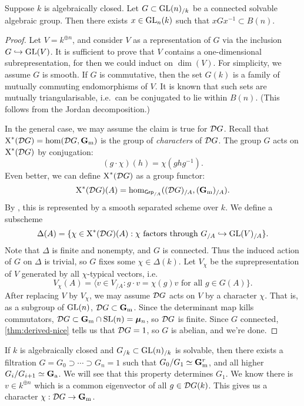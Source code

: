 \begin{theorem}\label{thm:lie-kolchin}
Suppose $k$ is algebraically closed. Let $G\subset \operatorname{GL}(n)_{/k}$ be a 
connected solvable algebraic group. Then there exists $x\in \operatorname{GL}_n(k)$ such that 
$x G x^{-1}\subset B(n)$. 
\end{theorem}
\begin{proof}
Let $V=k^{\oplus n}$, and consider $V$ as a representation of $G$ via the 
inclusion $G\hookrightarrow \operatorname{GL}(V)$. It is sufficient to prove that $V$ 
contains a one-dimensional subrepresentation, for then we could induct on 
$\dim(V)$. For simplicity, we assume $G$ is smooth. If $G$ is commutative, 
then the set $G(k)$ is a family of mutually commuting endomorphisms of $V$. 
It is known that such sets are mutually triangularisable, i.e.~can be 
conjugated to lie within $B(n)$. (This follows from the Jordan decomposition.) 

In the general case, we may assume the claim is true for $\mathcal{D} G$. 
Recall that $\operatorname{X}^\ast(\mathcal{D} G)=\hom(\mathcal{D} G,\mathbf{G}_\mathrm{m})$ is the group of 
\emph{characters} of $\mathcal{D} G$. The group $G$ acts on 
$\operatorname{X}^\ast(\mathcal{D} G)$ by conjugation: 
\[
  (g\cdot \chi)(h) = \chi(g h g^{-1}) .
\]
Even better, we can define $\operatorname{X}^\ast(\mathcal{D} G)$ as a group functor: 
\[
  \operatorname{X}^\ast(\mathcal{D} G)(A)=\hom_{\mathsf{Grp}_{/A}}((\mathcal{D} G)_{/A},(\mathbf{G}_\mathrm{m})_{/A}) .
\]
By \cite[11.4.2]{sga3-ii}, this is represented by a smooth separated scheme 
over $k$. We define a subscheme 
\[
  \Delta(A) = \{\chi\in \operatorname{X}^\ast(\mathcal{D} G)(A):\chi\text{ factors through }G_{/A}\hookrightarrow \operatorname{GL}(V)_{/A}\} .
\]
Note that $\Delta$ is finite and nonempty, and $G$ is connected. Thus the 
induced action of $G$ on $\Delta$ is trivial, so $G$ fixes some 
$\chi\in \Delta(k)$. Let $V_\chi$ be the suprepresentation 
of $V$ generated by all $\chi$-typical vectors, i.e. 
\[
  V_\chi(A) = \langle v\in V_{/A}:g\cdot v=\chi(g) v\text{ for all }g\in G(A)\} .
\]
After replacing $V$ by $V_\chi$, we may assume $\mathcal{D} G$ acts on $V$ by a 
character $\chi$. That is, as a subgroup of $\operatorname{GL}(n)$, $\mathcal{D} G\subset \mathbf{G}_\mathrm{m}$. 
Since the determinant map kills commutators, 
$\mathcal{D} G\subset \mathbf{G}_\mathrm{m}\cap \operatorname{SL}(n)=\bm{\mu}_n$, so $\mathcal{D} G$ is finite. Since $G$ 
connected, \autoref{thm:derived-nice} tells us that $\mathcal{D} G=1$, so $G$ is 
abelian, and we're done. 
\end{proof}

\begin{example}
If $k$ is algebraically closed and $G_{/k}\subset \operatorname{GL}(n)_{/k}$ is solvable, 
then there exists a filtration $G=G_0\supset \cdots \supset G_n=1$ such that 
$G_0/G_1\simeq \mathbf{G}_\mathrm{m}^r$, and all higher $G_i/G_{i+1}\simeq \mathbf{G}_\mathrm{a}$. We will see 
that this property determines $G_1$. We know there is $v\in k^{\oplus n}$ which 
is a common eigenvector of all $g\in \mathcal{D} G(k)$. This gives us a 
character $\chi:\mathcal{D} G\to \mathbf{G}_\mathrm{m}$. 
\end{example}

